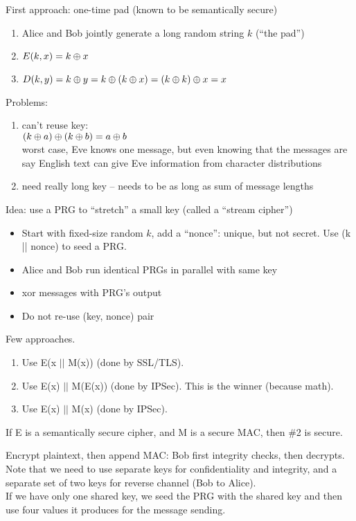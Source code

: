 First approach: one-time pad (known to be semantically secure)
\begin{enumerate}
    \item Alice and Bob jointly generate a long random string $k$ (``the pad'')
    \item $E(k, x) = k \oplus x$
    \item $D(k, y) = k \oplus y = k \oplus (k \oplus x) = (k \oplus k) \oplus x = x$
\end{enumerate}
Problems:
\begin{enumerate}
    \item can't reuse key:\\
        $(k \oplus a) \oplus (k \oplus b) = a \oplus b$\\
        worst case, Eve knows one message, but even knowing that the messages
        are say English text can give Eve information from character
        distributions
    \item need really long key -- needs to be as long as sum of message lengths
\end{enumerate}
Idea: use a PRG to ``stretch'' a small key (called a ``stream cipher'')
\begin{itemize}
    \item Start with fixed-size random $k$, add a ``nonce'': unique,
      but not secret.  Use (k || nonce) to seed a PRG.
    \item Alice and Bob run identical PRGs in parallel with same key
    \item xor messages with PRG's output
    \item Do not re-use (key, nonce) pair
\end{itemize}

Few approaches.
\begin{enumerate}
  \item Use E(x $||$ M(x)) (done by SSL/TLS).
  \item Use E(x) $||$ M(E(x)) (done by IPSec).  This is the winner (because math).
  \item Use E(x) $||$ M(x) (done by IPSec).
\end{enumerate}

\begin{theorem}
If E is a semantically secure cipher, and M is a secure MAC, then \#2 is secure.
\end{theorem}

Encrypt plaintext, then append MAC: Bob first integrity checks, then decrypts.
Note that we need to use separate keys for confidentiality and integrity, and a
separate set of two keys for reverse channel (Bob to Alice).\\

If we have only one shared key, we seed the PRG with the shared key and then use
four  values it produces for the message sending.
